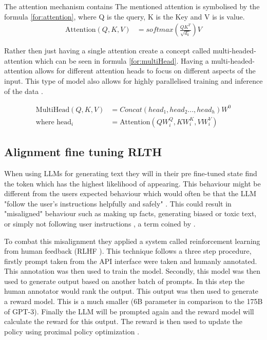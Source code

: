 The attention mechanism contains 
The mentioned attention is symbolised by the formula \ref{for:attention}, where Q is the query, K is the Key and V is is value. 
\begin{align}
\label{for:attention}
    \text{Attention}(Q,K,V) &= softmax(\frac{QK^T}{\sqrt{d_k}})V
\end{align}


Rather then just having a single attention \cite{vaswani2017attention} create a concept called multi-headed-attention which can be seen in formula \ref{for:multiHead}. Having a multi-headed-attention allows for different attention heads to focus on different aspects of the input. This type of model also allows for highly parallelised training and inference of the data \citep{min2023recent}. 

\begin{align}
\label{for:multiHead}
    \text{MultiHead}(Q,K,V) &= Concat(head_1, head_2 ... , head_h)W^0 \\
    \text{where head}_i &= \text{Attention}(QW_i^Q,KW^K_i, VW^V_i)
\end{align}



\subsection{Alignment fine tuning RLTH}
\label{sub:alignment}

When using LLMs for generating text they will in their pre fine-tuned state find the token which has the highest likelihood of appearing. This behaviour might be different from the users expected behaviour which would often be that the LLM "follow the user’s instructions helpfully and safely" \cite{ouyang2022training}. This could result in "misaligned" behaviour such as making up facts, generating biased or toxic text, or simply not following user instructions \cite{bommasani2021opportunities, bender2021dangers, kenton2021alignment} , a term coined by \citet{ouyang2022training}.

To combat this misalignment they applied a system called reinforcement learning from human feedback (RLHF \cite{christiano2017deep}). This technique follows a three step procedure, firstly prompt taken from the API interface were taken and humanly annotated. This annotation was then used to train the model. Secondly, this model was then used to generate output based on another batch of prompts. In this step the human annotator would rank the output. This output was then used to generate a reward model. This is a much smaller (6B parameter in comparison to the 175B of GPT-3). Finally the LLM will be prompted again and the reward model will calculate the reward for this output. The reward is then used to update the policy using proximal policy optimization \cite{ouyang2022training}.

